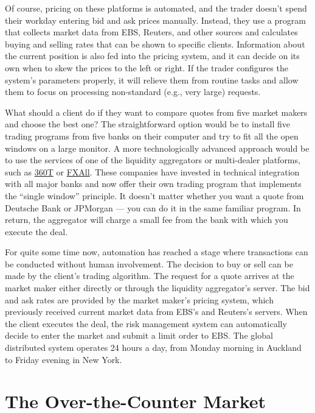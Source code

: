 \documentclass[a4paper,14pt]{extarticle}
\begin{document}
Of course, pricing on these platforms is automated, and the trader doesn't spend 
their workday entering bid and ask prices manually. Instead, they use a program 
that collects market data from EBS, Reuters, and other sources and calculates 
buying and selling rates that can be shown to specific clients. Information 
about the current position is also fed into the pricing system, and it can 
decide on its own when to skew the prices to the left or right. If the trader 
configures the system's parameters properly, it will relieve them from routine 
tasks and allow them to focus on processing non-standard (e.g., very large) 
requests.

What should a client do if they want to compare quotes from five market makers 
and choose the best one? The straightforward option would be to install five 
trading programs from five banks on their computer and try to fit all the open 
windows on a large monitor. A more technologically advanced approach would be to 
use the services of one of the liquidity aggregators or multi-dealer platforms, 
such as \href{https://www.360t.com/}{360T} or
\href{https://www.refinitiv.com/en/products/fxall-electronic-trading-platform}{FXAll}. These companies have invested in technical integration with all major 
banks and now offer their own trading program that implements the ``single 
window'' principle. It doesn't matter whether you want a quote from Deutsche 
Bank or JPMorgan --- you can do it in the same familiar program. In return, the 
aggregator will charge a small fee from the bank with which you execute 
the deal.

For quite some time now, automation has reached a stage where transactions can 
be conducted without human involvement. The decision to buy or sell can be made 
by the client's trading algorithm. The request for a quote arrives at the market 
maker either directly or through the liquidity aggregator's server. The bid 
and ask rates are provided by the market maker's pricing system, which 
previously received current market data from EBS's and Reuters's servers. 
When the client executes the deal, the risk management system can automatically 
decide to enter the market and submit a limit order to EBS. The global 
distributed system operates 24 hours a day, from Monday morning in Auckland to 
Friday evening in New York.

\section*{The Over-the-Counter Market}
\end{document}
